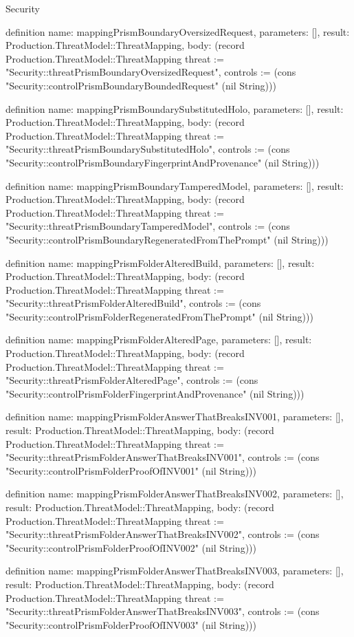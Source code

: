 \begin{lexlean}{Security}
\begin{semanticmodule}
definition{
  name: mappingPrismBoundaryOversizedRequest,
  parameters: [],
  result: Production.ThreatModel::ThreatMapping,
  body: (record Production.ThreatModel::ThreatMapping {threat := "Security::threatPrismBoundaryOversizedRequest", controls := (cons "Security::controlPrismBoundaryBoundedRequest" (nil String))})
}

definition{
  name: mappingPrismBoundarySubstitutedHolo,
  parameters: [],
  result: Production.ThreatModel::ThreatMapping,
  body: (record Production.ThreatModel::ThreatMapping {threat := "Security::threatPrismBoundarySubstitutedHolo", controls := (cons "Security::controlPrismBoundaryFingerprintAndProvenance" (nil String))})
}

definition{
  name: mappingPrismBoundaryTamperedModel,
  parameters: [],
  result: Production.ThreatModel::ThreatMapping,
  body: (record Production.ThreatModel::ThreatMapping {threat := "Security::threatPrismBoundaryTamperedModel", controls := (cons "Security::controlPrismBoundaryRegeneratedFromThePrompt" (nil String))})
}

definition{
  name: mappingPrismFolderAlteredBuild,
  parameters: [],
  result: Production.ThreatModel::ThreatMapping,
  body: (record Production.ThreatModel::ThreatMapping {threat := "Security::threatPrismFolderAlteredBuild", controls := (cons "Security::controlPrismFolderRegeneratedFromThePrompt" (nil String))})
}

definition{
  name: mappingPrismFolderAlteredPage,
  parameters: [],
  result: Production.ThreatModel::ThreatMapping,
  body: (record Production.ThreatModel::ThreatMapping {threat := "Security::threatPrismFolderAlteredPage", controls := (cons "Security::controlPrismFolderFingerprintAndProvenance" (nil String))})
}

definition{
  name: mappingPrismFolderAnswerThatBreaksINV001,
  parameters: [],
  result: Production.ThreatModel::ThreatMapping,
  body: (record Production.ThreatModel::ThreatMapping {threat := "Security::threatPrismFolderAnswerThatBreaksINV001", controls := (cons "Security::controlPrismFolderProofOfINV001" (nil String))})
}

definition{
  name: mappingPrismFolderAnswerThatBreaksINV002,
  parameters: [],
  result: Production.ThreatModel::ThreatMapping,
  body: (record Production.ThreatModel::ThreatMapping {threat := "Security::threatPrismFolderAnswerThatBreaksINV002", controls := (cons "Security::controlPrismFolderProofOfINV002" (nil String))})
}

definition{
  name: mappingPrismFolderAnswerThatBreaksINV003,
  parameters: [],
  result: Production.ThreatModel::ThreatMapping,
  body: (record Production.ThreatModel::ThreatMapping {threat := "Security::threatPrismFolderAnswerThatBreaksINV003", controls := (cons "Security::controlPrismFolderProofOfINV003" (nil String))})
}


\end{semanticmodule}
\end{lexlean}
